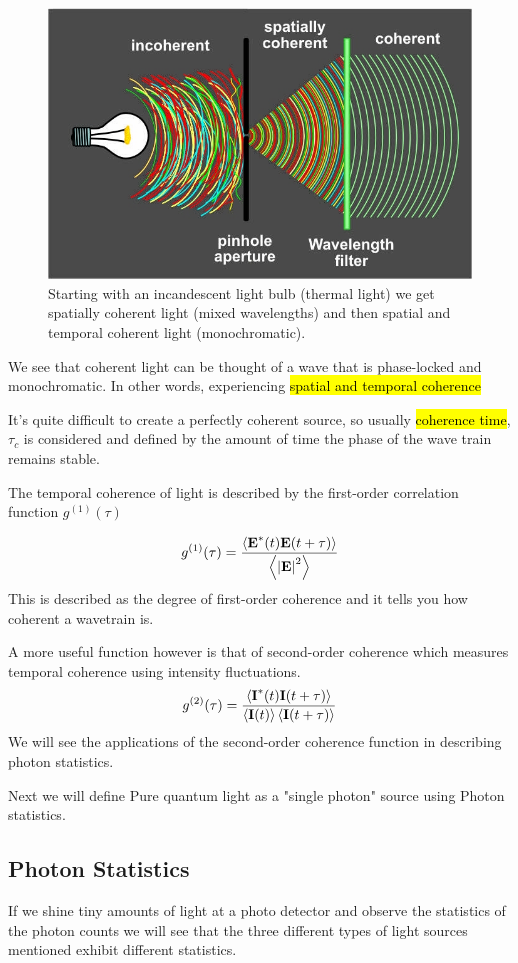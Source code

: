 \documentclass{article}
\begin{document}
\begin{figure}[!phbt]
    \centering
    \includegraphics[width=0.65\linewidth]{img/coherence.eps}
    \caption{Starting with an incandescent light bulb (thermal light) we get spatially coherent light (mixed wavelengths) and then spatial and temporal coherent light (monochromatic).}
    \label{fig:coherence}
\end{figure}
We see that coherent light can be thought of a wave that is phase-locked and monochromatic. In other words, experiencing \hl{spatial and temporal coherence}

It's quite difficult to create a perfectly coherent source, so usually \hl{coherence time}, $\tau_c$ is considered and defined by the amount of time the phase of the wave train remains stable. \cite{foxqmoptics}

The temporal coherence of light is described by the first-order correlation function $g^{(1)}(\tau)$

\begin{equation}
    g^{(1)}(\tau) = \frac{\expval{\textbf{E}^*(t)\textbf{E}(t+\tau)}}{\expval{\abs{\textbf{E}}^2}}
\end{equation}
This is described as the degree of first-order coherence and it tells you how coherent a wavetrain is.

A more useful function however is that of second-order coherence which measures temporal coherence using intensity fluctuations.
\begin{equation}
    g^{(2)}(\tau) = \frac{\expval{\textbf{I}^*(t)\textbf{I}(t+\tau)}}{\expval{\textbf{I}(t)}\expval{\textbf{I}(t+\tau)}}
\end{equation}
We will see the applications of the second-order coherence function in describing photon statistics.

Next we will define Pure quantum light as a "single photon" source using Photon statistics.
\pagebreak
\subsection{Photon Statistics}
If we shine tiny amounts of light at a photo detector and observe the statistics of the photon counts we will see that the three different types of light sources mentioned exhibit different statistics.
\end{document}
